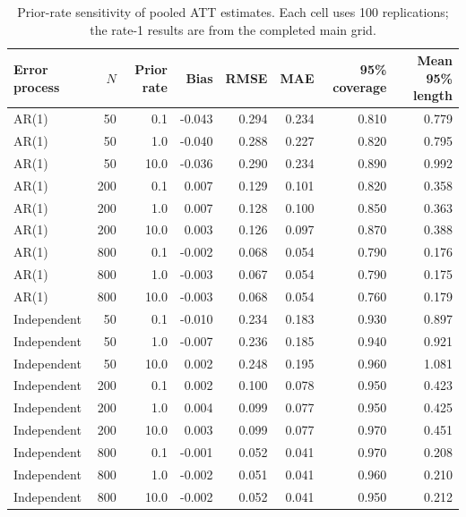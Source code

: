 \begin{table}[htbp]
\centering
\scriptsize
\caption{Prior-rate sensitivity of pooled ATT estimates. Each cell uses 100 replications; the rate-1 results are from the completed main grid.}
\label{tab:prior_sensitivity}
\begin{tabular}{lrrr rrrr}
\toprule
Error process & $N$ & Prior rate & Bias & RMSE & MAE & 95\% coverage & Mean 95\% length \\
\midrule
AR(1) & 50 & 0.1 & -0.043 & 0.294 & 0.234 & 0.810 & 0.779 \\
AR(1) & 50 & 1.0 & -0.040 & 0.288 & 0.227 & 0.820 & 0.795 \\
\addlinespace[1pt]
AR(1) & 50 & 10.0 & -0.036 & 0.290 & 0.234 & 0.890 & 0.992 \\
AR(1) & 200 & 0.1 & 0.007 & 0.129 & 0.101 & 0.820 & 0.358 \\
AR(1) & 200 & 1.0 & 0.007 & 0.128 & 0.100 & 0.850 & 0.363 \\
\addlinespace[1pt]
AR(1) & 200 & 10.0 & 0.003 & 0.126 & 0.097 & 0.870 & 0.388 \\
AR(1) & 800 & 0.1 & -0.002 & 0.068 & 0.054 & 0.790 & 0.176 \\
AR(1) & 800 & 1.0 & -0.003 & 0.067 & 0.054 & 0.790 & 0.175 \\
\addlinespace[1pt]
AR(1) & 800 & 10.0 & -0.003 & 0.068 & 0.054 & 0.760 & 0.179 \\
Independent & 50 & 0.1 & -0.010 & 0.234 & 0.183 & 0.930 & 0.897 \\
Independent & 50 & 1.0 & -0.007 & 0.236 & 0.185 & 0.940 & 0.921 \\
\addlinespace[1pt]
Independent & 50 & 10.0 & 0.002 & 0.248 & 0.195 & 0.960 & 1.081 \\
Independent & 200 & 0.1 & 0.002 & 0.100 & 0.078 & 0.950 & 0.423 \\
Independent & 200 & 1.0 & 0.004 & 0.099 & 0.077 & 0.950 & 0.425 \\
\addlinespace[1pt]
Independent & 200 & 10.0 & 0.003 & 0.099 & 0.077 & 0.970 & 0.451 \\
Independent & 800 & 0.1 & -0.001 & 0.052 & 0.041 & 0.970 & 0.208 \\
Independent & 800 & 1.0 & -0.002 & 0.051 & 0.041 & 0.960 & 0.210 \\
\addlinespace[1pt]
Independent & 800 & 10.0 & -0.002 & 0.052 & 0.041 & 0.950 & 0.212 \\
\bottomrule
\end{tabular}
\end{table}
